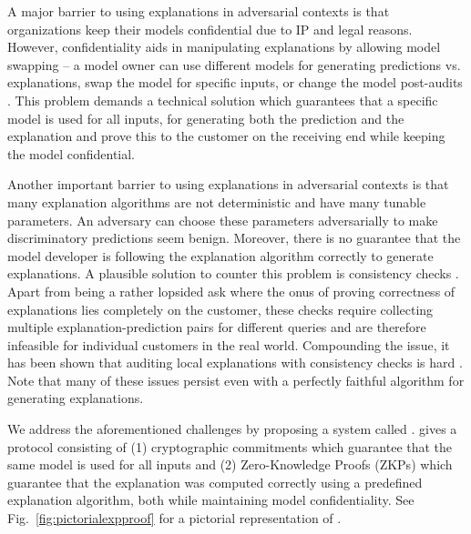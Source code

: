 A major barrier to using explanations in adversarial contexts is that organizations keep their models confidential due to IP and legal reasons. However, confidentiality aids in manipulating explanations by allowing model swapping -- a model owner can use different models for generating predictions vs. explanations, swap the model for specific inputs, or change the model post-audits \cite{slack2020fooling, yadav2022xaudit, yan2022active}. This problem demands a technical solution which guarantees that a specific model is used for all inputs, for generating both the prediction and the explanation and prove this to the customer on the receiving end while keeping the model confidential.

Another important barrier to using explanations in adversarial contexts is that many explanation algorithms are not deterministic and have many tunable parameters. An adversary can choose these parameters adversarially to make discriminatory predictions seem benign. Moreover, there is no guarantee that the model developer is following the explanation algorithm correctly to generate explanations. A plausible solution to counter this problem is consistency checks \cite{bhattacharjee2024auditing, dasgupta2022framework}. Apart from being a rather lopsided ask where the onus of proving correctness of explanations lies completely on the customer, these checks require collecting multiple explanation-prediction pairs for different queries and are therefore infeasible for individual customers in the real world. Compounding the issue, it has been shown that auditing local explanations with consistency checks is hard \cite{bhattacharjee2024auditing}.
Note that many of these issues persist even with a perfectly faithful algorithm for generating explanations.



We address the aforementioned challenges by proposing a system called \name. \name gives a protocol consisting of (1) cryptographic commitments which guarantee that the same model is used for all inputs and (2) Zero-Knowledge Proofs (ZKPs) which guarantee that the explanation was computed correctly using a predefined explanation algorithm, both while maintaining model confidentiality. See Fig.~\ref{fig:pictorialexpproof} for a pictorial representation of \name.

